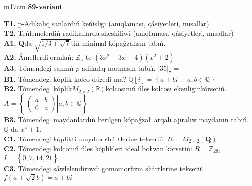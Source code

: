 \documentclass{article}
\begin{document}
\begin{tabular}{m{17cm}}
\textbf{89-variant}
\newline

\textbf{T1.} p-Adikalıq sanlardıń keńisligi (anıqlaması, qásiyetleri, mısallar) \\
\textbf{T2.} Teńlemelerdiń radikallarda sheshiliwi (anıqlaması, qásiyetleri, mısallar) \\
\textbf{A1.} \(\mathbf{Q}\)da \(\sqrt{1/3 + \sqrt{7}}\)tiń minimal kópaǵzalısın tabıń. \\
\textbf{A2.} Ámellerdi orınlań: \(\mathbb{Z}_{5}\) te \(\left( 3x^{2} + 3x - 4 \right)\left( x^{2} + 2 \right)\) \\
\textbf{A3.} Tómendegi sannıń \(p\)-adikalıq normasın tabıń. \(|35|_{7} =\) \\
\textbf{B1.} Tómendegi kóplik kolco dúzedi ma? \(\mathbb{Q}\left\lfloor i \right\rfloor = \left\{ a + bi\ \ :\ \ a,b\mathbb{\in Q} \right\}\) \\
\textbf{B2.} Tómendegi kóplik\(M_{2 \times 2}\left( \mathbb{R} \right)\)kolcosınıń úles kolcosı ekenliginkórsetiń. \(A = \left\{ \left. \ \begin{pmatrix}
a & b \\
0 & a
\end{pmatrix} \right|a,b\mathbb{\in Q} \right\}\) \\
\textbf{B3.} Tómendegi maydanlardıń berilgen kópaǵzalı arqalı ajıralıw maydanın tabıń. \(\mathbb{Q}\) da \(x^{4} + 1\). \\
\textbf{C1.} Tómendegi kóplikti maydan shártlerine tekseriń. \(R = M_{2 \times 2}\left( \mathbf{Q} \right)\) \\
\textbf{C2.} Tómendegi kolconıń úles kóplikleri ideal bolıwın kórsetiń:
\(R = \mathbb{Z}_{28}\), \(I = \left\{ \overline{0},\overline{7},\overline{14},\overline{21} \right\}\) \\
\textbf{C3.} Tómendegi sáwlelendiriwdi gomomorfizm shártlerine tekseriń. \(f\left( a + \sqrt{2}b \right) = a + bi\) \\

\end{tabular}
\vspace{1cm}
\end{document}
